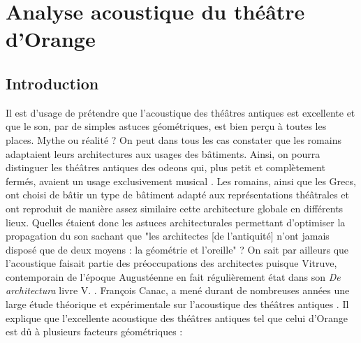 \part{Analyse acoustique du théâtre d'Orange}
\label{part3}

\chapter*{Introduction}
	
 Il est d'usage de prétendre que l'acoustique des théâtres antiques est excellente et que le son, par de simples astuces géométriques, est bien perçu à toutes les places. Mythe ou réalité ? On peut dans tous les cas constater que les romains adaptaient leurs architectures aux usages des bâtiments. Ainsi, on pourra distinguer les théâtres antiques des \glspl{odeon} qui, plus petit et complètement fermés, avaient un usage exclusivement musical \cite[p.1]{roofodeon}. Les romains, ainsi que les Grecs, ont choisi de bâtir un type de bâtiment adapté aux représentations théâtrales et ont reproduit de manière assez similaire cette architecture globale en différents lieux. Quelles étaient donc les astuces architecturales permettant d'optimiser la propagation du son sachant que "les architectes [de l'antiquité] n'ont jamais disposé que de deux moyens : la géométrie et l'oreille" \cite[p.15]{canac} ? On sait par ailleurs que l'acoustique faisait partie des préoccupations des architectes puisque Vitruve, contemporain de l'époque Augustéenne en fait régulièrement état dans son \textit{De architectura} livre V. \cite[Livre V]{vitruve}. François Canac, a mené durant de nombreuses années une large étude théorique et expérimentale sur l'acoustique des théâtres antiques \cite{canac}. Il explique que l'excellente acoustique des théâtres antiques tel que celui d'Orange est dû à plusieurs facteurs géométriques :
